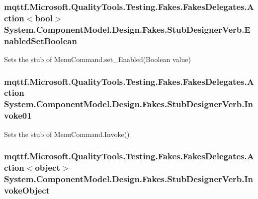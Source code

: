 \hypertarget{class_system_1_1_component_model_1_1_design_1_1_fakes_1_1_stub_designer_verb_afb9c7950629289a60a161f16abe85e62}{
\subsubsection[{Enabled\-Set\-Boolean}]{\setlength{\rightskip}{0pt plus 5cm}mqttf.\-Microsoft.\-Quality\-Tools.\-Testing.\-Fakes.\-Fakes\-Delegates.\-Action$<$bool$>$ System.\-Component\-Model.\-Design.\-Fakes.\-Stub\-Designer\-Verb.\-Enabled\-Set\-Boolean}}\label{class_system_1_1_component_model_1_1_design_1_1_fakes_1_1_stub_designer_verb_afb9c7950629289a60a161f16abe85e62}


Sets the stub of Menu\-Command.\-set\-\_\-\-Enabled(\-Boolean value)

\hypertarget{class_system_1_1_component_model_1_1_design_1_1_fakes_1_1_stub_designer_verb_a16f465857c56a9f9c2de2e7a9365ad41}{
\subsubsection[{Invoke01}]{\setlength{\rightskip}{0pt plus 5cm}mqttf.\-Microsoft.\-Quality\-Tools.\-Testing.\-Fakes.\-Fakes\-Delegates.\-Action System.\-Component\-Model.\-Design.\-Fakes.\-Stub\-Designer\-Verb.\-Invoke01}}\label{class_system_1_1_component_model_1_1_design_1_1_fakes_1_1_stub_designer_verb_a16f465857c56a9f9c2de2e7a9365ad41}


Sets the stub of Menu\-Command.\-Invoke()

\hypertarget{class_system_1_1_component_model_1_1_design_1_1_fakes_1_1_stub_designer_verb_a8c503fa1267fc5de3561794f43259d12}{
\subsubsection[{Invoke\-Object}]{\setlength{\rightskip}{0pt plus 5cm}mqttf.\-Microsoft.\-Quality\-Tools.\-Testing.\-Fakes.\-Fakes\-Delegates.\-Action$<$object$>$ System.\-Component\-Model.\-Design.\-Fakes.\-Stub\-Designer\-Verb.\-Invoke\-Object}}\label{class_system_1_1_component_model_1_1_design_1_1_fakes_1_1_stub_designer_verb_a8c503fa1267fc5de3561794f43259d12}


